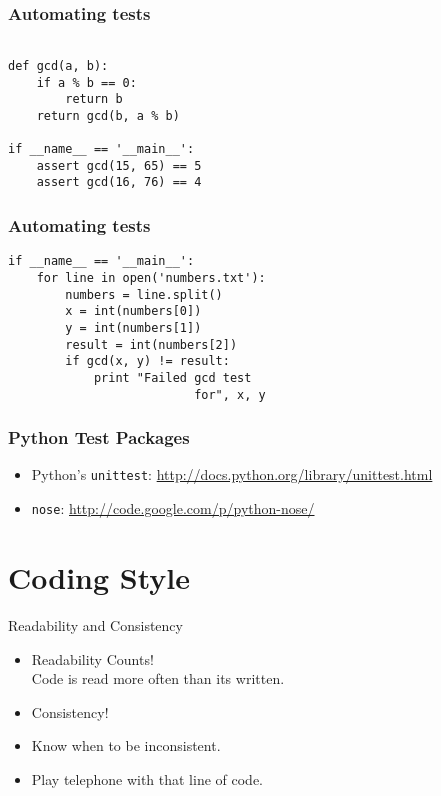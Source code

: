 \documentclass[compress,14pt]{beamer}
\newcommand{\typ}[1]{\lstinline{#1}}
\begin{document}
\begin{frame}[fragile]
  \frametitle{Automating tests}
  \begin{lstlisting}
  
def gcd(a, b):
    if a % b == 0:
        return b
    return gcd(b, a % b)

if __name__ == '__main__':
    assert gcd(15, 65) == 5
    assert gcd(16, 76) == 4

  \end{lstlisting}  
\end{frame}

\begin{frame}[fragile]
  \frametitle{Automating tests}
  \begin{lstlisting}
if __name__ == '__main__':
    for line in open('numbers.txt'):
        numbers = line.split()
        x = int(numbers[0])
        y = int(numbers[1])
        result = int(numbers[2])
        if gcd(x, y) != result:
            print "Failed gcd test
                          for", x, y
  \end{lstlisting}  
\end{frame}

\begin{frame}[fragile]
  \frametitle{Python Test Packages}
    \begin{itemize}

\item Python's \typ{unittest}:\linebreak
  \url{http://docs.python.org/library/unittest.html}
\linebreak
\item \typ{nose}:\linebreak
  \url{http://code.google.com/p/python-nose/}
  \end{itemize}
\end{frame}

\section{Coding Style}
\begin{frame}{Readability and Consistency}
    \begin{itemize}
        \item Readability Counts!\\Code is read more often than its written.
        \item Consistency!
        \item Know when to be inconsistent.
        \item Play telephone with that line of code.
      \end{itemize}
\end{frame}
\end{document}
